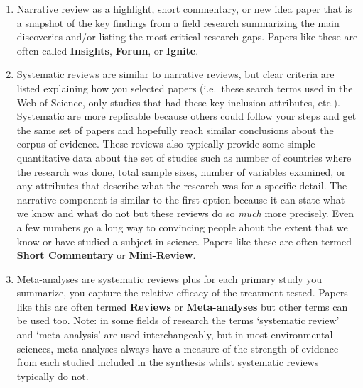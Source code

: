 \documentclass[
]{book}
\begin{document}
\begin{enumerate}
\def\labelenumi{(\arabic{enumi})}
\item
  Narrative review as a highlight, short commentary, or new idea paper that is a snapshot of the key findings from a field research summarizing the main discoveries and/or listing the most critical research gaps. Papers like these are often called \textbf{Insights}, \textbf{Forum}, or \textbf{Ignite}.
\item
  Systematic reviews are similar to narrative reviews, but clear criteria are listed explaining how you selected papers (i.e.~these search terms used in the Web of Science, only studies that had these key inclusion attributes, etc.). Systematic are more replicable because others could follow your steps and get the same set of papers and hopefully reach similar conclusions about the corpus of evidence. These reviews also typically provide some simple quantitative data about the set of studies such as number of countries where the research was done, total sample sizes, number of variables examined, or any attributes that describe what the research was for a specific detail. The narrative component is similar to the first option because it can state what we know and what do not but these reviews do so \emph{much} more precisely. Even a few numbers go a long way to convincing people about the extent that we know or have studied a subject in science. Papers like these are often termed \textbf{Short Commentary} or \textbf{Mini-Review}.
\item
  Meta-analyses are systematic reviews plus for each primary study you summarize, you capture the relative efficacy of the treatment tested. Papers like this are often termed \textbf{Reviews} or \textbf{Meta-analyses} but other terms can be used too. Note: in some fields of research the terms `systematic review' and `meta-analysis' are used interchangeably, but in most environmental sciences, meta-analyses always have a measure of the strength of evidence from each studied included in the synthesis whilst systematic reviews typically do not.
\end{enumerate}
\end{document}
